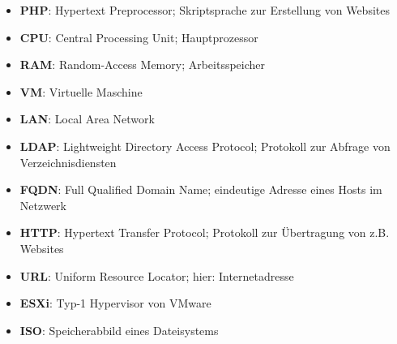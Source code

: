
%


\begin{itemize}
	\item \textbf{PHP}: Hypertext Preprocessor; Skriptsprache zur Erstellung von Websites
	\item \textbf{CPU}: Central Processing Unit; Hauptprozessor
	\item \textbf{RAM}: Random-Access Memory; Arbeitsspeicher
	\item \textbf{VM}: Virtuelle Maschine
	\item \textbf{LAN}: Local Area Network
	\item \textbf{LDAP}: Lightweight Directory Access Protocol; Protokoll zur Abfrage von Verzeichnisdiensten
	\item \textbf{FQDN}: Full Qualified Domain Name; eindeutige Adresse eines Hosts im Netzwerk
	\item \textbf{HTTP}: Hypertext Transfer Protocol; Protokoll zur Übertragung von z.B. Websites
	\item \textbf{URL}: Uniform Resource Locator; hier: Internetadresse
	\item \textbf{ESXi}: Typ-1 Hypervisor von VMware
	\item \textbf{ISO}: Speicherabbild eines Dateisystems
\end{itemize}

\begin{acronym}[WWWW]
\end{acronym}
